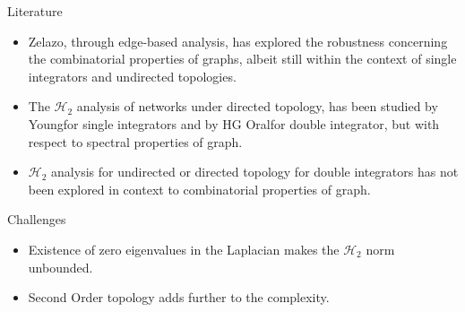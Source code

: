 \begin{frame}		
\begin{block}{Literature}
	\begin{itemize}
		\item Zelazo\footnotemark[1], through edge-based analysis, has explored the robustness concerning the combinatorial properties of graphs, albeit still within the context of single integrators and undirected topologies.
		\item The $\mathcal{H}_2$ analysis of networks under directed topology, has been studied by Young\footnotemark[2] for single integrators and by HG Oral\footnotemark[3] for double integrator, but with respect to spectral properties of graph.
		\item $\mathcal{H}_2$ analysis for undirected or directed topology for double integrators has not been explored in context to combinatorial properties of graph.
	\end{itemize}
\end{block}	
\begin{alertblock}{Challenges}
\begin{itemize}
\item Existence of zero eigenvalues in the Laplacian makes the $\mathcal{H}_2$ norm unbounded.
\item Second Order topology adds further to the complexity.
\end{itemize}
\end{alertblock}
\vspace{0.1cm}
\end{frame}
